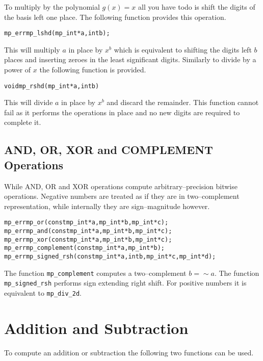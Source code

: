 \documentclass[synpaper]{book}
\begin{document}
To multiply by the polynomial $g(x) = x$ all you have todo is shift the digits of the basis left
one place.  The following function provides this operation.

\begin{alltt}
mp_err mp_lshd (mp_int *a, int b);
\end{alltt}

This will multiply $a$ in place by $x^b$ which is equivalent to shifting the digits left $b$ places
and inserting zeroes in the least significant digits.  Similarly to divide by a power of $x$ the
following function is provided.

\begin{alltt}
void mp_rshd (mp_int *a, int b)
\end{alltt}
This will divide $a$ in place by $x^b$ and discard the remainder.  This function cannot fail as it
performs the operations in place and no new digits are required to complete it.

\subsection{AND, OR, XOR and COMPLEMENT Operations}

While AND, OR and XOR operations compute arbitrary--precision bitwise operations. Negative numbers
are treated as if they are in two--complement representation, while internally they are
sign--magnitude however.

    
\begin{alltt}
mp_err mp_or  (const mp_int *a, mp_int *b, mp_int *c);
mp_err mp_and (const mp_int *a, mp_int *b, mp_int *c);
mp_err mp_xor (const mp_int *a, mp_int *b, mp_int *c);
mp_err mp_complement(const mp_int *a, mp_int *b);
mp_err mp_signed_rsh(const mp_int *a, int b, mp_int *c, mp_int *d);
\end{alltt}

The function \texttt{mp\_complement} computes a two--complement $b = \sim a$. The function
\texttt{mp\_signed\_rsh} performs sign extending right shift. For positive numbers it is equivalent
to \texttt{mp\_div\_2d}.
\section{Addition and Subtraction}

To compute an addition or subtraction the following two functions can be used.
\end{document}
